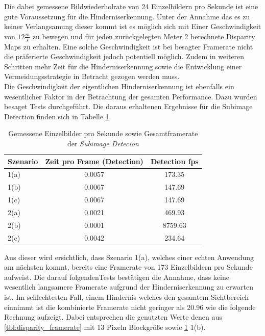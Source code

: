 \noindent
Die dabei gemessene Bildwiederholrate von 24 Einzelbildern pro Sekunde ist eine gute Voraussetzung für die Hinderniserkennung. Unter der Annahme das es zu keiner Verlangsamung dieser kommt ist es möglich sich mit Einer Geschwindigkeit von $12\frac{m}{s}$ zu bewegen und für jeden zurückgelegten Meter 2 berechnete Disparity Maps zu erhalten. Eine solche Geschwindigkeit ist bei besagter Framerate nicht die präferierte Geschwindigkeit jedoch potentiell möglich. Zudem in weiteren Schritten mehr Zeit für die Hinderniserkennung sowie die Entwicklung einer Vermeidungsstrategie in Betracht gezogen werden muss.\\

\noindent
Die Geschwindigkeit der eigentlichen Hinderniserkennung ist ebenfalls ein wesentlicher Faktor in der Betrachtung der gesamten Performance. Dazu wurden besaget Tests durchgeführt. Die daraus erhaltenen Ergebnisse für die Subimage Detection finden sich in Tabelle \ref{tbl:subimage_framerate}.

\begin{table}[h]
\centering
\begin{tabular}{|l|c|c|}
\hline
Szenario & Zeit pro Frame (Detection) & Detection fps \\ \hline \hline
1(a)     & 0.0057                     & 173.35        \\ \hline
1(b)     & 0.0067                     & 147.69        \\ \hline
1(c)     & 0.0067                     & 147.69        \\ \hline \hline
2(a)     & 0.0021                     & 469.93        \\ \hline
2(b)     & 0.0001                     & 8759.63       \\ \hline
2(c)     & 0.0042                     & 234.64        \\ \hline
\end{tabular}
\caption{Gemessene Einzelbilder pro Sekunde sowie Gesamtframerate der \emph{Subimage Detecion}}
\label{tbl:subimage_framerate}
\end{table}

\noindent
Aus dieser wird ersichtlich, dass Szenario 1(a), welches einer echten Anwendung am nächsten kommt, bereits eine Framerate von 173 Einzelbildern pro Sekunde aufweist. Die darauf folgendenTests bestätigen die Annahme, dass keine wesentlich langsamere Framerate aufgrund der Hinderniserkennung zu erwarten ist. Im schlechtesten Fall, einem Hindernis welches den gesamtem Sichtbereich einnimmt ist die kombinierte Framerate nicht geringer als 20.96 wie die folgende Rechnung aufzeigt. Dabei entsprechen die genutzten Werte denen aus \ref{tbl:disparity_framerate} mit 13 Pixeln Blockgröße sowie \ref{tbl:subimage_framerate} 1(b). 

